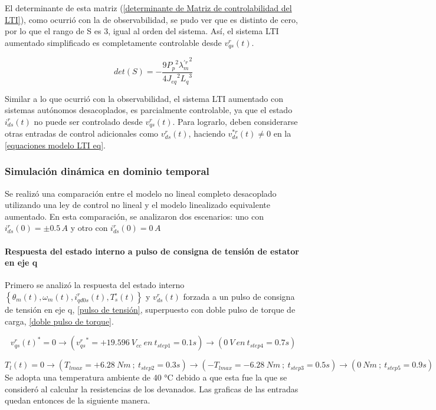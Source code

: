 \documentclass[a4paper, 10pt, onecolumn,journal]{ieeeconf}
\begin{document}
El determinante de esta matriz (\cref{determinante de Matriz de controlabilidad del LTI}), 
como ocurrió con la de observabilidad, se pudo ver que es distinto de cero, por lo que el rango de S es 3, igual al orden del sistema. Así, el sistema LTI aumentado simplificado es completamente controlable desde $v^r_{qs}(t)$.

\begin{equation}
	det(S)= -\frac{9 {P_p}^2 {\lambda^{'r}_m}^2}{4 {J_{eq}}^2 {{L_q}}^3}
	\label{determinante de Matriz de controlabilidad del LTI}
\end{equation}

Similar a lo que ocurrió con la observabilidad, el sistema LTI aumentado con sistemas autónomos desacoplados, es parcialmente controlable, ya que el estado ${i}^r_{ds}(t) $  no puede ser controlado desde $v^r_{qs}(t)$. Para lograrlo, deben considerarse otras entradas de control adicionales como  $v^r_{ds}(t)$, haciendo
$v^{*r}_{ds}(t) \neq 0$ en la \cref{equaciones modelo LTI eq}.


\subsubsection{\textbf{Simulación dinámica en dominio temporal}} 
Se realizó una comparación entre el modelo no lineal completo desacoplado utilizando una ley de control no lineal y el modelo linealizado equivalente aumentado. En esta comparación, se analizaron dos escenarios: uno con $i^r_{ds}(0) = \pm 0.5 \, A $  y otro con $i^r_{ds}(0) = 0 \, A $ 
\paragraph{\textbf{Respuesta del estado interno a pulso de consigna de tensión de estator en eje q}}
Primero se analizó la respuesta del estado interno $\left\lbrace \theta_m(t), \omega_{m}(t), i^r_{qd0s}(t), T^\circ_s(t)\right\rbrace $ y $v^r_{ds}(t)$ forzada a un pulso de consigna de tensión en eje q, \cref{pulso de tensión}, superpuesto con doble pulso de torque de carga, \cref{doble pulso de torque}.

\begin{equation}
	{v^r_{qs}(t)}^* = 0 \rightarrow \left({v^r_{qs}}^* = +19.596 \: V_{cc} \  en \ t_{step1}=0.1s \right) \rightarrow \left(0 \: V \  en \ t_{step4}=0.7s \right)
	\label{pulso de tensión}
\end{equation}

\begin{equation}
	T_{l}(t) = 0 \rightarrow \left(T_{lmax} = +6.28 \: Nm \ ; \ t_{step2}=0.3s \right) \rightarrow \left(-T_{lmax} = -6.28 \: Nm \ ; \ t_{step3}=0.5s \right)
	 \rightarrow \left(0 \: Nm \ ; \ t_{step5}=0.9s \right) 
	 \label{doble pulso de torque}
\end{equation}
Se adopta una temperatura ambiente de 40 °C debido a que esta fue la que se consideró al calcular la resistencias de los devanados. Las graficas de las entradas quedan entonces de la siguiente manera.
\end{document}
